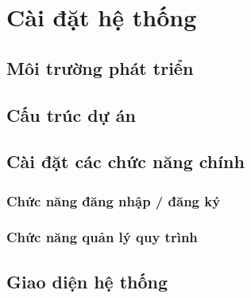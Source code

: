 
\chapter{Cài đặt hệ thống}
\label{chap:cai_dat}

\section{Môi trường phát triển}
\label{sec:moi_truong}



\section{Cấu trúc dự án}
\label{sec:cau_truc_du_an}



\section{Cài đặt các chức năng chính}
\label{sec:cai_dat_chuc_nang}


\subsection{Chức năng đăng nhập / đăng ký}
\label{subsec:dang_nhap}



\subsection{Chức năng quản lý quy trình}
\label{subsec:quan_ly_quy_trinh}



\section{Giao diện hệ thống}
\label{sec:giao_dien}

